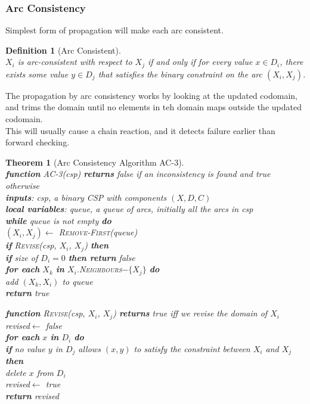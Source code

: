 \documentclass[12pt]{article}
\newcommand{\ind}{\hspace*{15pt}}
\newtheorem{definition}{Definition}[section]
\newtheorem{theorem}{Theorem}[section]
\theoremstyle{definition}
\begin{document}
\subsubsection{Arc Consistency}
Simplest form of propagation will make each arc consistent.
\begin{definition}[Arc Consistent]
\hfill\\\normalfont $X_i$ is arc-consistent with respect to $X_j$ if and only if for every value $x\in D_i$, there exists some value $y\in D_j$ that satisfies the binary constraint on the arc $(X_i, X_j)$.
\end{definition}
The propagation by arc consistency works by looking at the updated codomain, and trims the domain until no elements in teh domain maps outside the updated codomain. \\
This will usually cause a chain reaction, and it detects failure earlier than forward checking.
\begin{theorem}[Arc Consistency Algorithm AC-3]
\hfill\\\normalfont
\textbf{function} AC-3(\textit{csp}) \textbf{returns} false if an inconsistency is found and true otherwise\\
\ind \textbf{inputs}: \textit{csp}, a binary CSP with components $(X,D,C)$\\
\ind \textbf{local variables}: \textit{queue}, a queue of arcs, initially all the arcs in \textit{csp}\\

\ind \textbf{while} \textit{queue} is not empty \textbf{do}\\
\ind \ind $(X_i, X_j)\leftarrow$ \textsc{Remove-First}(\textit{queue})\\
\ind \ind \textbf{if} \textsc{Revise}(\textit{csp}, $X_i$, $X_j$) \textbf{then}\\
\ind \ind \ind \textbf{if} size of $D_i=0$ \textbf{then return} \textit{false}\\
\ind \ind \ind \textbf{for each} $X_k$ \textbf{in} $X_i$.\textsc{Neighbours}$-\{X_j\}$ \textbf{do}\\
\ind \ind \ind \ind add $(X_k,X_i)$ to \textit{queue}\\
\ind \textbf{return} \textit{true}

\textbf{function} \textsc{Revise}(\textit{csp}, $X_i$, $X_j$) \textbf{returns} true iff we revise the domain of $X_i$\\
\ind \textit{revised}$\leftarrow$ \textit{false}\\
\ind \textbf{for each} $x$ \textbf{in} $D_i$ \textbf{do}\\
\ind \ind \textbf{if} no value $y$ in $D_j$ allows $(x, y)$ to satisfy the constraint between $X_i$ and $X_j$ \textbf{then}\\
\ind \ind \ind delete $x$ from $D_i$\\
\ind \ind \ind \textit{revised}$\leftarrow$ \textit{true}\\
\ind \textbf{return} \textit{revised}
\end{theorem}
\end{document}
